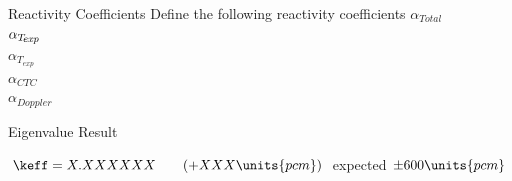 \begin{frame}{Reactivity Coefficients}
  Define the following reactivity coefficients 
  $\alpha_{Total}$\\
  $\alpha_{T_{\!\mbox{\scriptsize \em exp}}}$\\
  $\alpha_{T_{exp}}$\\
  $\alpha_{CTC}$\\ %
  $\alpha_{Doppler}$
\end{frame}

\begin{frame}{Eigenvalue Result}
  \vspace{-0.25in}
  \begin{figure}
    \centering
    \hspace{1in}
  \end{figure}
  \begin{block}{}
    $\keff = X.XXXXXX \qquad (+XXX \units{pcm})$ expected $\pm 600\units{pcm}$
  \end{block}
\end{frame}

